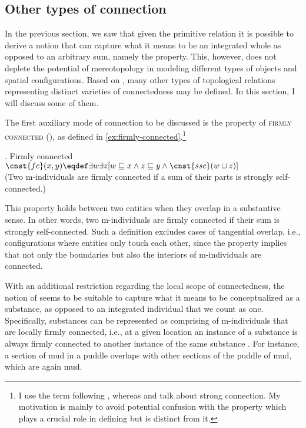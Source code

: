 \subsection{Other types of connection}\label{sec:other-types-of-connection}

In the previous section, we saw that given the primitive relation  it is possible to derive a notion that can capture what it means to be an integrated whole as opposed to an arbitrary sum, namely the  property. This, however, does not deplete the potential of mereotopology in modeling different types of objects and spatial configurations. Based on , many other types of topological relations representing distinct varieties of connectedness may be defined. In this section, I will discuss some of them.

\begin{sloppypar}
The first auxiliary mode of connection to be discussed is the property of \textsc{firmly connected} (), as defined in \ref{ex:firmly-connected}.\footnote{I use the term following \citet{varzi2007spatial}, whereas \citet{casati_varzi1999parts} and \citet{grimm2012degrees,grimm2012number} talk about strong connection. My motivation is mainly to avoid potential confusion with the  property which plays a crucial role in defining  but is distinct from it.} 
\end{sloppypar}

\ex. Firmly connected \citep[p. 1003; adapted]{varzi2007spatial}\label{ex:firmly-connected}\\
$\cnst{fc}(x,y) \eqdef \exists w \exists z[w \sqsubseteq x \wedge z \sqsubseteq y \wedge \cnst{ssc}(w \sqcup z)]$\\
(Two m-individuals are firmly connected if a sum of their parts is strongly self-connected.)

This property holds between two entities when they overlap in a substantive sense. In other words, two m-individuals are firmly connected if their sum is strongly self-connected. Such a definition excludes cases of tangential overlap, i.e., configurations where entities only touch each other, since the  property implies that not only the boundaries but also the interiors of m-individuals are connected.

With an additional restriction regarding the local scope of connectedness, the notion of  seems to be suitable to capture what it means to be conceptualized as a substance, as opposed to an integrated individual that we count as one. Specifically, substances can be represented as comprising of m-individuals that are locally firmly connected, i.e., at a given location an instance of a substance is always firmly connected to another instance of the same substance \citep[pp. 140--142]{grimm2012degrees,grimm2012number}. For instance, a section of mud in a puddle overlaps with other sections of the puddle of mud, which are again mud.  

